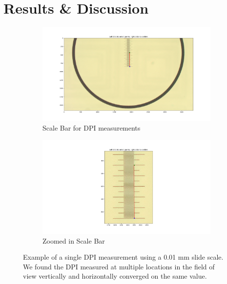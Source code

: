 \documentclass[a4paper,12pt]{article}
\begin{document}
\section{Results \& Discussion} 

\begin{figure}
  \centering
  \begin{subfigure}{.5\textwidth}
    \centering
    \includegraphics[height=0.5\linewidth]{../diagrams/dpi_measurement_whole.png}
    \caption{Scale Bar for DPI measurements}
    \label{fig:dpi_measurement_whole}
  \end{subfigure}%
  \begin{subfigure}{.5\textwidth}
    \centering
    \includegraphics[height=0.5\linewidth]{../diagrams/dpi_measurement_zoomed_2.png}
    \caption{Zoomed in Scale Bar}
    \label{fig:dpi_measurement_zoomed}
  \end{subfigure}
  \caption{Example of a single DPI measurement using a 0.01 mm slide scale. We found the DPI measured at multiple locations in the field of view vertically and horizontally  converged on the same value.}
  \label{fig:dpi_measurements}
\end{figure}
\end{document}
